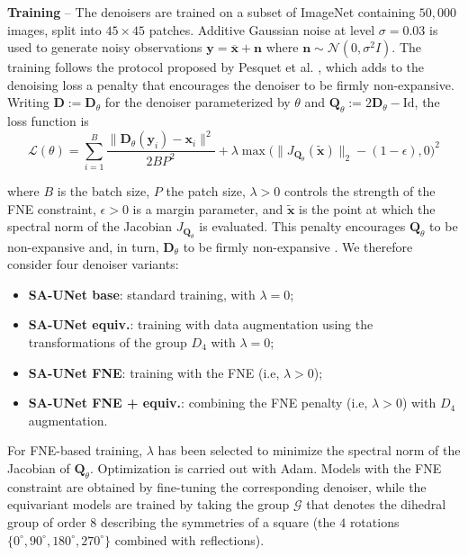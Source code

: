 \documentclass{article}
\newcommand{\Id}{\mathrm{Id}}
\newcommand{\xb}{\mathbf{x}}
\begin{document}
\noindent\textbf{Training} -- The denoisers are trained on a subset of ImageNet containing
$50{,}000$ images, split into $45\times45$ patches. Additive
Gaussian noise at level $\sigma=0.03$ is used to generate noisy
observations 
$\mathbf{y} = \overline{\xb} + \mathbf{n}$ where $\mathbf{n} \sim \mathcal{N}(0,\sigma^2 I)$. 
The training follows the protocol proposed by Pesquet et al.
\cite{Pesquet2021}, which adds to the denoising loss a penalty that
encourages the denoiser to be firmly non-expansive. Writing $\mathbf{D}:=\mathbf{D}_\theta$
for the denoiser parameterized by $\theta$ and $\mathbf{Q}_\theta :=
2\mathbf{D}_\theta - \Id$, the loss function is\vspace{-0.2cm}
{\small{\[
  \mathcal{L}(\theta)=\sum_{i=1}^{B}\frac{\big\|\mathbf{D}_\theta(\mathbf{y}_i)-\xb_i\big\|^2}{2BP^2}
  +
  \lambda \max\big(\big\|J_{\mathbf{Q}_\theta}(\tilde{\xb})\big\|_2 - (1-\epsilon), 0\big)^2
\]}}\vspace{-0.4cm}

\noindent \!\!where $B$ is the batch size, $P$ the patch size,
$\lambda>0$ controls the strength of the FNE constraint,
$\epsilon>0$ is a margin parameter, and $\tilde{\xb}$ is the point at
which the spectral norm of the Jacobian $J_{\mathbf{Q}_\theta}$ is evaluated.
This penalty encourages $\mathbf{Q}_\theta$ to be non-expansive and, in turn,
$\mathbf{D}_\theta$ to be firmly non-expansive \cite{Pesquet2021}. We therefore consider four denoiser variants:\vspace{-0.3cm}
\begin{itemize}
\item \textbf{SA-UNet base}: standard training, with $\lambda=0$;\vspace{-0.3cm}
\item \textbf{SA-UNet equiv.}: training with data augmentation
using the transformations of the group $D_4$ with $\lambda=0$;\vspace{-0.3cm}
\item \textbf{SA-UNet FNE}: training with the FNE (i.e, $\lambda>0$);\vspace{-0.3cm}
\item \textbf{SA-UNet FNE + equiv.}: combining the FNE penalty (i.e, $\lambda>0$)
with $D_4$ augmentation.\vspace{-0.3cm}
\end{itemize}
For FNE-based training, $\lambda$ has been selected to minimize the spectral
norm of the Jacobian of $\mathbf{Q}_\theta$.
Optimization is carried out with Adam. Models with the FNE constraint
are obtained by fine-tuning the corresponding denoiser, while the
equivariant models are trained by taking the group $\mathcal{G}$ that denotes the dihedral group of order $8$
describing the symmetries of a square (the $4$ rotations
$\{0^\circ,90^\circ,180^\circ, 270^\circ\}$ combined with reflections).
\end{document}
